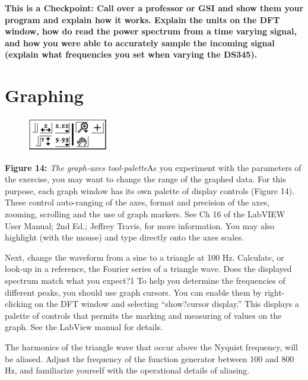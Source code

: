 \documentclass{../lab}
\begin{document}
\textbf{ This is a Checkpoint: Call over a professor or GSI and show them your program and explain how it works.  Explain the units on the DFT window, how do read the power spectrum from a time varying signal, and how you were able to accurately sample the incoming signal (explain what frequencies you set when varying the DS345). }
\section{Graphing}


\begin{figure}[h]
    \centering
    \href{http://experimentationlab.berkeley.edu/sites/default/files/images/Nldimage069.gif}{\includegraphics[width=0.5\linewidth]{images/Nldimage069.png}}
    \caption{}
    \label{fig:Nldimage069}
\end{figure}

\textbf{Figure 14:} \emph{The graph-axes tool-palette}As you experiment with the parameters of the exercise, you may want to change the range of the graphed data. For this purpose, each graph window has its own palette of display controls (Figure 14). These control auto-ranging of the axes, format and precision of the axes, zooming, scrolling and the use of graph markers. See Ch 16 of the LabVIEW User Manual; 2nd Ed.; Jeffrey Travis, for more information. You may also highlight (with the mouse) and type directly onto the axes scales.

Next, change the waveform from a sine to a triangle at 100 Hz. Calculate, or look-up in a reference, the Fourier series of a triangle wave. Does the displayed spectrum match what you expect?1 To help you determine the frequencies of different peaks, you should use graph cursors. You can enable them by right-clicking on the DFT window and selecting ``show?cursor display.'' This displays a palette of controls that permits the marking and measuring of values on the graph. See the LabView manual for details.

The harmonics of the triangle wave that occur above the Nyquist frequency, will be aliased. Adjust the frequency of the function generator between 100 and 800 Hz, and familiarize yourself with the operational details of aliasing.
\end{document}
